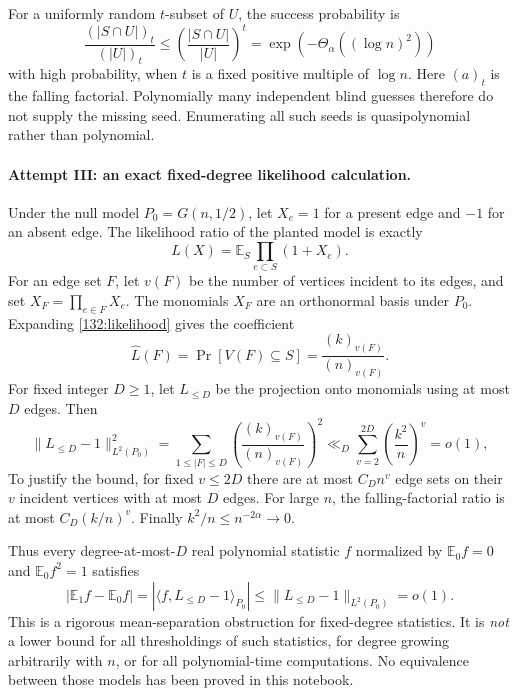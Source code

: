 \documentclass[11pt,a4paper]{article}
\newcommand{\E}{\mathbb{E}}
\numberwithin{equation}{section}
\begin{document}
For a uniformly random $t$-subset of $U$, the success probability is
\[
 \frac{(|S\cap U|)_t}{(|U|)_t}
 \leq\left(\frac{|S\cap U|}{|U|}\right)^t
 =\exp(-\Theta_\alpha((\log n)^2))
\]
with high probability, when $t$ is a fixed positive multiple of
$\log n$.  Here $(a)_t$ is the falling factorial.  Polynomially many
independent blind guesses therefore do not supply the missing seed.
Enumerating all such seeds is quasipolynomial rather than polynomial.

\paragraph{Attempt III: an exact fixed-degree likelihood calculation.}
Under the null model $P_0=G(n,1/2)$, let $X_e=1$ for a present edge
and $-1$ for an absent edge.  The likelihood ratio of the planted
model is exactly
\begin{equation}\label{132:likelihood}
 L(X)=\E_S\prod_{e\subset S}(1+X_e).
\end{equation}
For an edge set $F$, let $v(F)$ be the number of vertices incident to
its edges, and set $X_F=\prod_{e\in F}X_e$.  The monomials $X_F$ are
an orthonormal basis under $P_0$.  Expanding \eqref{132:likelihood}
gives the coefficient
\[
 \widehat L(F)=\Pr[V(F)\subseteq S]=\frac{(k)_{v(F)}}{(n)_{v(F)}}.
\]
For fixed integer $D\geq1$, let $L_{\leq D}$ be the projection onto
monomials using at most $D$ edges.  Then
\begin{equation}\label{132:lowdegree}
 \|L_{\leq D}-1\|_{L^2(P_0)}^2
 =\sum_{1\leq|F|\leq D}
       \left(\frac{(k)_{v(F)}}{(n)_{v(F)}}\right)^2
 \ll_D\sum_{v=2}^{2D}\left(\frac{k^2}{n}\right)^v=o(1),
\end{equation}
To justify the bound, for fixed $v\leq2D$ there are at most
$C_D n^v$ edge sets on their $v$ incident vertices with at most $D$
edges.  For large $n$, the falling-factorial ratio is at most
$C_D(k/n)^v$.  Finally $k^2/n\leq n^{-2\alpha}\to0$.

Thus every degree-at-most-$D$ real polynomial statistic $f$ normalized
by $\E_0f=0$ and $\E_0f^2=1$ satisfies
\[
 |\E_1f-\E_0f|
   =|\langle f,L_{\leq D}-1\rangle_{P_0}|
   \leq\|L_{\leq D}-1\|_{L^2(P_0)}=o(1).
\]
This is a rigorous mean-separation obstruction for fixed-degree
statistics.  It is \emph{not} a lower bound for all thresholdings of
such statistics, for degree growing arbitrarily with $n$, or for
all polynomial-time computations.  No equivalence between those
models has been proved in this notebook.
\end{document}
